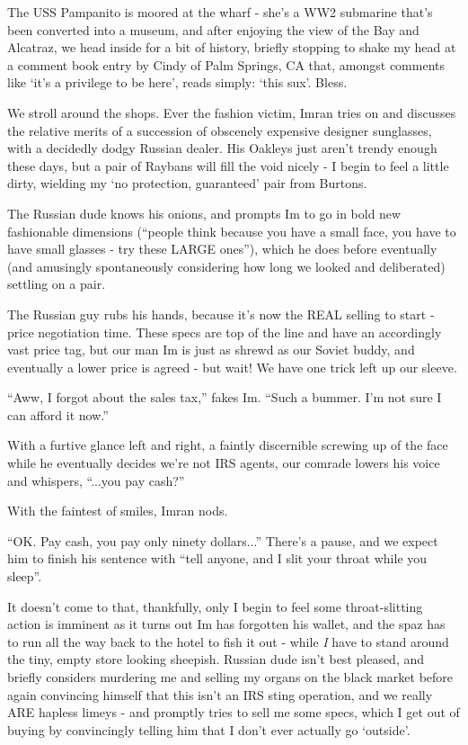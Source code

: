 \documentclass[a5paper,titlepage,11pt]{book}
\begin{document}
The USS Pampanito is moored at the wharf - she's a WW2 submarine that's been converted into a museum, and after enjoying the view of the Bay and Alcatraz, we head inside for a bit of history, briefly stopping to shake my head at a comment book entry by Cindy of Palm Springs, CA that, amongst comments like `it's a privilege to be here', reads simply: `this sux'.  Bless.

We stroll around the shops.  Ever the fashion victim, Imran tries on and discusses the relative merits of a succession of obscenely expensive designer sunglasses, with a decidedly dodgy Russian dealer.  His Oakleys just aren't trendy enough these days, but a pair of Raybans will fill the void nicely - I begin to feel a little dirty, wielding my  `no protection, guaranteed' pair from Burtons.

The Russian dude knows his onions, and prompts Im to go in bold new fashionable dimensions (``people think because you have a small face, you have to have small glasses - try these LARGE ones''), which he does before eventually (and amusingly spontaneously considering how long we looked and deliberated) settling on a pair.

The Russian guy rubs his hands, because it's now the REAL selling to start - price negotiation time.  These specs are top of the line and have an accordingly vast price tag, but our man Im is just as shrewd as our Soviet buddy, and eventually a lower price is agreed - but wait!  We have one trick left up our sleeve.

``Aww, I forgot about the sales tax,'' fakes Im.  ``Such a bummer.  I'm not sure I can afford it now.''

With a furtive glance left and right, a faintly discernible screwing up of the face while he eventually decides we're not IRS agents, our comrade lowers his voice and whispers, ``...you pay cash?''

With the faintest of smiles, Imran nods.

``OK.  Pay cash, you pay only ninety dollars...'' There's a pause, and we expect him to finish his sentence with ``tell anyone, and I slit your throat while you sleep''.

It doesn't come to that, thankfully, only I begin to feel some throat-slitting action is imminent as it turns out Im has forgotten his wallet, and the spaz has to run all the way back to the hotel to fish it out - while \emph{I} have to stand around the tiny, empty store looking sheepish.  Russian dude isn't best pleased, and briefly considers murdering me and selling my organs on the black market before again convincing himself that this isn't an IRS sting operation, and we really ARE hapless limeys - and promptly tries to sell me some specs, which I get out of buying by convincingly telling him that I don't ever actually go `outside'.
\end{document}
